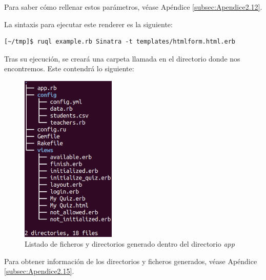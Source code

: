 Para saber c\'omo rellenar estos par\'ametros, v\'ease Ap\'endice \ref{subsec:Apendice2.12}.
\bigskip

La sintaxis para ejecutar este renderer es la siguiente:
\begin{verbatim}
[~/tmp]$ ruql example.rb Sinatra -t templates/htmlform.html.erb
\end{verbatim}

Tras su ejecuci\'on, se crear\'a una carpeta llamada  en el directorio donde nos encontremos. Este  contendr\'a lo siguiente:
\begin{figure}[!th]
\begin{center}
\includegraphics[width=0.4\textwidth]{images/app.eps}
\caption{Listado de ficheros y directorios generado dentro del directorio \textit{app}}
\label{fig:app}
\end{center}
\end{figure}
  
Para obtener informaci\'on de los directorios y ficheros generados, v\'ease Ap\'endice \ref{subsec:Apendice2.15}.
\bigskip
\bigskip
\bigskip

